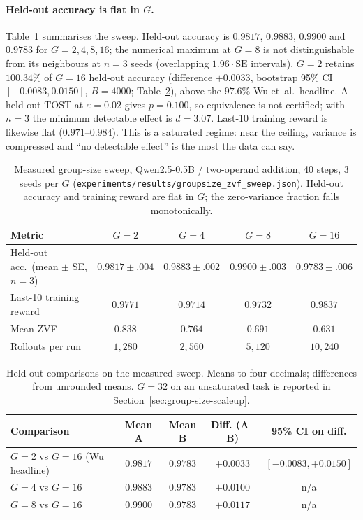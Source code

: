\paragraph{Held-out accuracy is flat in $G$.}
Table~\ref{tab:groupsize-summary} summarises the sweep. Held-out accuracy is
$0.9817$, $0.9883$, $0.9900$ and $0.9783$ for $G{=}2,4,8,16$; the numerical
maximum at $G{=}8$ is not distinguishable from its neighbours at $n{=}3$ seeds
(overlapping $1.96\cdot\mathrm{SE}$ intervals). $G{=}2$ retains $100.34\%$ of
$G{=}16$ held-out accuracy (difference $+0.0033$, bootstrap 95\% CI
$[-0.0083, 0.0150]$, $B{=}4000$; Table~\ref{tab:groupsize-dpo-check}), above the
$97.6\%$ Wu et~al.\ headline. A held-out TOST at $\varepsilon{=}0.02$ gives
$p{=}0.100$, so equivalence is not certified; with $n{=}3$ the minimum detectable
effect is $d{=}3.07$. Last-10 training reward is likewise flat
($0.971$--$0.984$). This is a saturated regime: near the ceiling, variance is
compressed and ``no detectable effect'' is the most the data can say.

\begin{table}[htbp]
\centering
\small
\begin{tabular}{lcccc}
\toprule
Metric & $G{=}2$ & $G{=}4$ & $G{=}8$ & $G{=}16$ \\
\midrule
Held-out acc.\ (mean $\pm$ SE, $n{=}3$) & $0.9817{\pm}.004$ & $0.9883{\pm}.002$ & $0.9900{\pm}.003$ & $0.9783{\pm}.006$ \\
Last-10 training reward & $0.9771$ & $0.9714$ & $0.9732$ & $0.9837$ \\
Mean ZVF & $0.838$ & $0.764$ & $0.691$ & $0.631$ \\
Rollouts per run & $1{,}280$ & $2{,}560$ & $5{,}120$ & $10{,}240$ \\
\bottomrule
\end{tabular}
\caption{Measured group-size sweep, Qwen2.5-0.5B / two-operand addition, 40
steps, 3 seeds per $G$
(\texttt{experiments/results/groupsize\_zvf\_sweep.json}). Held-out accuracy and
training reward are flat in $G$; the zero-variance fraction falls monotonically.}
\label{tab:groupsize-summary}
\end{table}

\begin{table}[htbp]
\centering
\small
\begin{tabular}{lcccc}
\toprule
Comparison & Mean A & Mean B & Diff. (A--B) & 95\% CI on diff. \\
\midrule
$G{=}2$ vs $G{=}16$ (Wu headline) & $0.9817$ & $0.9783$ & $+0.0033$ & $[-0.0083, +0.0150]$ \\
$G{=}4$ vs $G{=}16$               & $0.9883$ & $0.9783$ & $+0.0100$ & n/a \\
$G{=}8$ vs $G{=}16$               & $0.9900$ & $0.9783$ & $+0.0117$ & n/a \\
\bottomrule
\end{tabular}
\caption{Held-out comparisons on the measured sweep. Means to four decimals;
differences from unrounded means. $G{=}32$ on an unsaturated task is reported in
Section~\ref{sec:group-size-scaleup}.}
\label{tab:groupsize-dpo-check}
\end{table}

